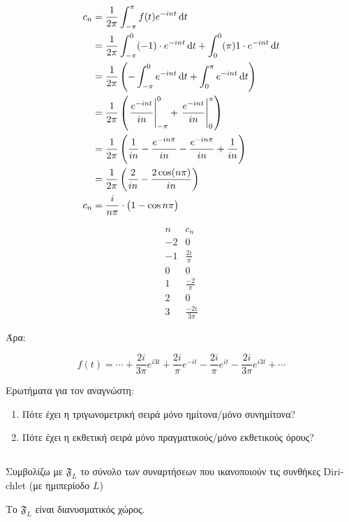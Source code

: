 \documentclass[11pt,a4paper,titlepage,draft]{article}
\begin{document}
\begin{align*}
c_n &= \frac{1}{2\pi}
\int_{-\pi}^\pi f(t)e^{-int}\dif t \\
&=
\frac{1}{2\pi}
\int_{-\pi}^0(-1)\cdot e^{-int} \dif t
+
\int_{0}^0(\pi)1\cdot e^{-int} \dif t
\\ &=
\frac{1}{2\pi}
\left(
- \int_{-\pi}^0e^{-int}\dif t
+ \int_0^\pi e^{-int} \dif t
\right)
\\ &=
\frac{1}{2\pi}
\left(
 \left. \frac{e^{-int}}{in} \right|_{-\pi}^0
+ \left. \frac{e^{-int}}{in} \right|_0^\pi
\right)
\\ &=
\frac{1}{2\pi} \left(
\frac{1}{in} - \frac{e^{-in\pi}}{in} - \frac{e^{-in\pi}}{in} + \frac{1}{in}
\right)
\\ &=
\frac{1}{2\pi}
\left(
\frac{2}{in}
- \frac{2\cos (n \pi)}{in}
\right)
\\ c_n &=
\frac{i}{n\pi}
\cdot \big(
1-\cos n\pi
\big)
\end{align*}

\[
\begin{array}{r|l}
n & c_n \\
-2 & 0 \\
-1 & \frac{2i}{\pi} \\
0 & 0 \\
1 & \frac{-2}{\pi} \\
2 & 0 \\
3 & \frac{-2i}{3\pi}
\end{array}
\]

Άρα:

\[
f(t) = \cdots + \frac{2i}{3\pi} e^{i3t} + \frac{2i}{\pi} e^{-it}
- \frac{2i}{\pi} e^{it}
- \frac{2i}{3\pi} e^{i3t} + \cdots
\]

Ερωτήματα για τον αναγνώστη:
\begin{enumerate}
\item
Πότε έχει η τριγωνομετρική σειρά μόνο ημίτονα/μόνο συνημίτονα?
\item
Πότε έχει η εκθετική σειρά μόνο πραγματικούς/μόνο εκθετικούς όρους?
\end{enumerate}

\subsection{}
\begin{defn*}{}
Συμβολίζω με \(\mathfrak{F}_L\) το σύνολο των συναρτήσεων που ικανοποιούν τις συνθήκες \textlatin{Dirichlet} (με ημιπερίοδο \(L\))
\end{defn*}

\begin{theorem*}{}
Το \(\mathfrak F_L\) είναι διανυσματικός χώρος. 
\end{theorem*}
\end{document}
